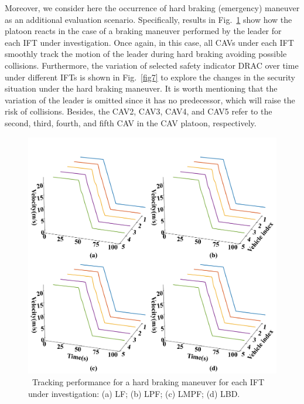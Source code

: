 \documentclass[a4paper]{cas-sc}
\begin{document}
Moreover, we consider here the occurrence of hard braking (emergency) maneuver as an additional evaluation scenario. Specifically, results in Fig.~\ref{fig6} show how the platoon reacts in the case of a braking maneuver performed by the leader for each IFT under investigation. Once again, in this case, all CAVs under each IFT smoothly track the motion of the leader during hard braking avoiding possible collisions. Furthermore, the variation of selected safety indicator DRAC over time under different IFTs is shown in Fig.~\ref{fig7} to explore the changes in the security situation under the hard braking maneuver. It is worth mentioning that the variation of the leader is omitted since it has no predecessor, which will raise the risk of collisions. Besides, the CAV2, CAV3, CAV4, and CAV5 refer to the second, third, fourth, and fifth CAV in the CAV platoon, respectively.

\begin{figure}
  \centering
  \includegraphics[width=14cm]{figs/fig6.png}
  \caption{~Tracking performance for a hard braking maneuver for each IFT under investigation: (a) LF; (b) LPF; (c) LMPF; (d) LBD.}
  \label{fig6}
\end{figure}
\end{document}
